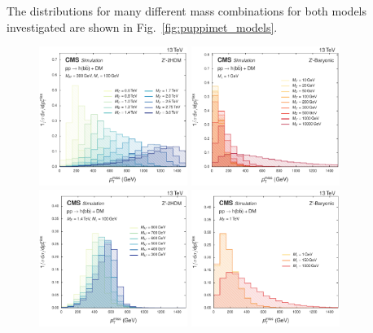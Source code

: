 The \MET distributions for many different mass combinations for both models investigated are shown in Fig.~\ref{fig:puppimet_models}. 

\begin{figure}[htbp]
   \centering
   \includegraphics[width=0.43\textwidth]{figures/models/puppimet_signals_2hdm.pdf}
   \includegraphics[width=0.43\textwidth]{figures/models/puppimet_signals_barzp.pdf}\\
   \includegraphics[width=0.43\textwidth]{figures/models/puppimet_signals_2hdm-300.pdf}
   \includegraphics[width=0.43\textwidth]{figures/models/puppimet_signals_barzp-1000.pdf}\\

\end{figure}
